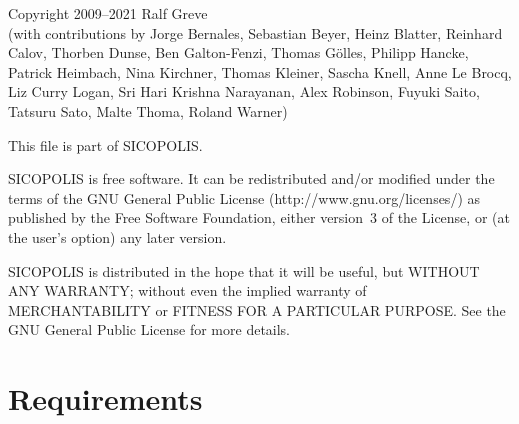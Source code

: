 \documentclass[12pt,a4paper]{article}
\begin{document}
\begin{center}\begin{minipage}{0.85\textwidth}

\begin{small}

\noindent{}Copyright 2009--2021 Ralf Greve\\
(with contributions by Jorge Bernales, Sebastian Beyer, Heinz Blatter, Reinhard Calov, Thorben Dunse, Ben Galton-Fenzi, Thomas G\"olles, Philipp Hancke, Patrick Heimbach, Nina Kirchner, Thomas Kleiner, Sascha Knell, Anne Le Brocq, Liz Curry Logan, Sri Hari Krishna Narayanan, Alex Robinson, Fuyuki Saito, Tatsuru Sato, Malte Thoma, Roland Warner)

\vspace*{1.5ex}

\noindent{}This file is part of SICOPOLIS.

\vspace*{1.5ex}

\noindent{}SICOPOLIS is free software. It can be redistributed and/or modified under the terms of the GNU General Public License (http://www.gnu.org/licenses/) as published by the Free Software Foundation, either version~3 of the License, or (at the user's option) any later version.

\vspace*{1.5ex}

\noindent{}SICOPOLIS is distributed in the hope that it will be useful, but WITHOUT ANY WARRANTY; without even the implied warranty of MERCHANTABILITY or FITNESS FOR A PARTICULAR PURPOSE.  See the GNU General Public License for more details.

\end{small}

\end{minipage}\end{center}

\vfill

\rule{0mm}{0mm}

\clearpage

\section{Requirements}
\end{document}
